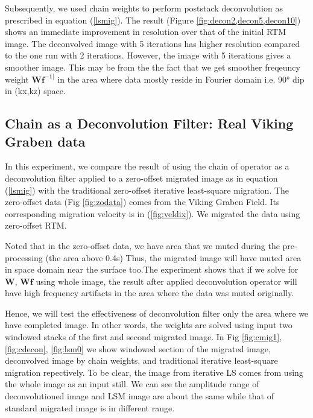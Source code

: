 

%

Subsequently, we used chain weights to perform poststack deconvolution as prescribed in equation (\ref{lsmig}). The result (Figure \ref{fig:decon2,decon5,decon10}) shows an immediate improvement in resolution over that of the initial RTM image. The deconvolved image with 5 iterations has higher resolution compared to the one run with 2 iterations. However, the image with 5 iterations gives a smoother image. This may be from the the fact that we get smoother freqeuncy weight $\mathbf{Wf^{-1]}}$ in the area where data mostly reside in Fourier domain i.e. 90° dip in (kx,kz) space.



%
%

\subsection*{Chain as a Deconvolution Filter: Real Viking Graben data}

In this experiment, we compare the result of using the chain of operator as a deconvolution filter applied to a zero-offset migrated image as in equation (\ref{lsmig}) with the traditional zero-offset iterative least-square migration. The zero-offset data (Fig \ref{fig:zodata}) comes from the Viking Graben Field. Its corresponding migration velocity is in (\ref{fig:veldix}). We migrated the data using zero-offset RTM. 


Noted that in the zero-offset data, we have area that we muted during the pre-processing (the area above 0.4s) Thus, the migrated image will have muted area in space domain near the surface too.The experiment shows that if we solve for $\mathbf{W}$, $\mathbf{Wf}$ using whole image, the result after applied deconvolution operator will have high frequency artifacts in the area where the data was muted originally.

%
Hence, we will test the effectiveness of deconvolution filter only the area where we have completed image. In other words, the weights are solved using input two windowed stacks of the first and second migrated image. In Fig \ref{fig:cmig1}, \ref{fig:cdecon}, \ref{fig:lsm0} we show windowed section of the migrated image, deconvolved image by chain weights, and traditional iterative least-square migration repectively. To be clear, the image from iterative LS comes from using the whole image as an input still. We can see the amplitude range of deconvolutioned image and LSM image are about the same while that of standard migrated image is in different range.  

